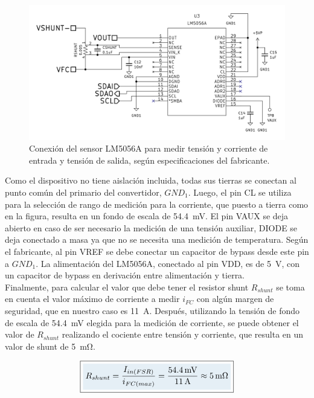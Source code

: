 \begin{figure}[h]
    \centering
    \includegraphics[scale=0.22]{Imagenes/Conexion LM5056A.png}
    \caption{Conexión del sensor LM5056A para medir tensión y corriente de entrada y tensión de salida, según especificaciones del fabricante.}
    \label{conexion_LM5056A}
\end{figure}

Como el dispositivo no tiene aislación incluida, todas sus tierras se conectan al punto común del primario del convertidor, $GND_1$. Luego, el pin CL se utiliza para la selección de rango de medición para la corriente, que puesto a tierra como en la figura, resulta en un fondo de escala de \SI[]{54.4}[]{\milli\volt}. El pin VAUX se deja abierto en caso de ser necesario la medición de una tensión auxiliar, DIODE se deja conectado a masa ya que no se necesita una medición de temperatura. Según el fabricante, al pin VREF se debe conectar un capacitor de bypass desde este pin a $GND_1$. La alimentación del LM5056A, conectado al pin VDD, es de \SI[]{5}[]{\volt}, con un capacitor de bypass en derivación entre alimentación y tierra.\\

Finalmente, para calcular el valor que debe tener el resistor shunt $R_{shunt}$ se toma en cuenta el valor máximo de corriente a medir $i_{FC}$ con algún margen de seguridad, que en nuestro caso es \SI[]{11}[]{\ampere}. Después, utilizando la tensión de fondo de escala de \SI[]{54.4}[]{\milli\volt} elegida para la medición de corriente, se puede obtener el valor de $R_{shunt}$ realizando el cociente entre tensión y corriente, que resulta en un valor de shunt de \SI[]{5}[]{\milli\ohm}.

\begin{equation}\label{calculo_shunt}
    \boxed{\highlight{
    R_{shunt} = \frac{I_{in(FSR)}}{i_{FC(max)}} = \frac{\SI{54.4}{\milli\volt}}{\SI{11}{\ampere}} \approx \SI[]{5}[]{\milli\ohm}
    }}
\end{equation}

